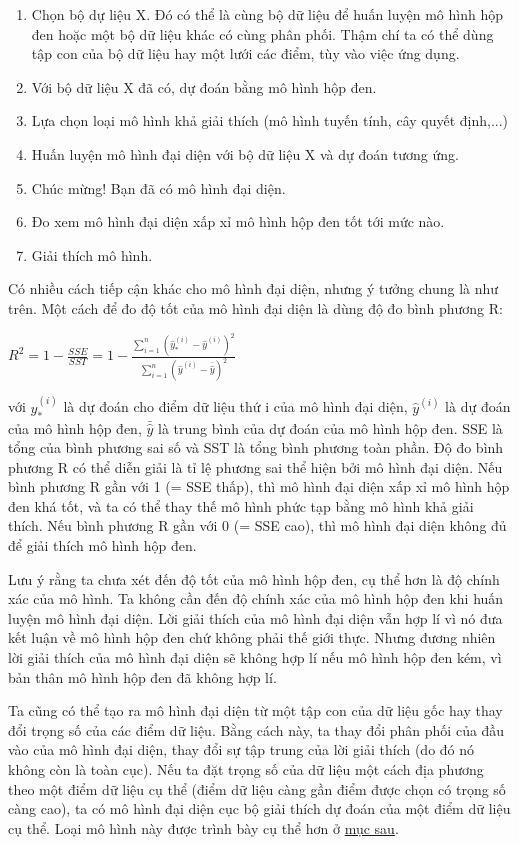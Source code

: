 \begin{enumerate}
    \item Chọn bộ dự liệu X. Đó có thể là cùng bộ dữ liệu để huấn luyện mô hình hộp đen hoặc một bộ dữ liệu khác có cùng phân phối. Thậm chí ta có thể dùng tập con của bộ dữ liệu hay một lưới các điểm, tùy vào việc ứng dụng.
    \item Với bộ dữ liệu X đã có, dự đoán bằng mô hình hộp đen.
    \item Lựa chọn loại mô hình khả giải thích (mô hình tuyến tính, cây quyết định,...)
    \item Huấn luyện mô hình đại diện với bộ dữ liệu X và dự đoán tương ứng.
    \item Chúc mừng! Bạn đã có mô hình đại diện.
    \item Đo xem mô hình đại diện xấp xỉ mô hình hộp đen tốt tới mức nào.
    \item Giải thích mô hình.
\end{enumerate}

Có nhiều cách tiếp cận khác cho mô hình đại diện, nhưng ý tưởng chung là như trên. Một cách để đo độ tốt của mô hình đại diện là dùng độ đo bình phương R:
\begin{center}
    $R^2=1-\frac{SSE}{SST}=1-\frac{\sum_{i=1}^n(\hat{y}_*^{(i)}-\hat{y}^{(i)})^2}{\sum_{i=1}^n(\hat{y}^{(i)}-\bar{\hat{y}})^2}$
\end{center}
với $\hat{y}_*^{(i)}$ là dự đoán cho điểm dữ liệu thứ i của mô hình đại diện, $\hat{y}^{(i)}$ là dự đoán của mô hình hộp đen, $\bar{\hat{y}}$ là trung bình của dự đoán của mô hình hộp đen. SSE là tổng của bình phương sai số và SST là tổng bình phương toàn phần. Độ đo bình phương R có thể diễn giải là tỉ lệ phương sai thể hiện bởi mô hình đại diện. Nếu bình phương R gần với 1 (= SSE thấp), thì mô hình đại diện xấp xỉ mô hình hộp đen khá tốt, và ta có thể thay thế mô hình phức tạp bằng mô hình khả giải thích. Nếu bình phương R gần với 0 (= SSE cao), thì mô hình đại diện không đủ để giải thích mô hình hộp đen.

Lưu ý rằng ta chưa xét đến độ tốt của mô hình hộp đen, cụ thể hơn là độ chính xác của mô hình. Ta không cần đến độ chính xác của mô hình hộp đen khi huấn luyện mô hình đại diện. Lời giải thích của mô hình đại diện vẫn hợp lí vì nó đưa kết luận về mô hình hộp đen chứ không phải thế giới thực. Nhưng đương nhiên lời giải thích của mô hình đại diện sẽ không hợp lí nếu mô hình hộp đen kém, vì bản thân mô hình hộp đen đã không hợp lí.

Ta cũng có thể tạo ra mô hình đại diện từ một tập con của dữ liệu gốc hay thay đổi trọng số của các điểm dữ liệu. Bằng cách này, ta thay đổi phân phối của đầu vào của mô hình đại diện, thay đổi sự tập trung của lời giải thích (do đó nó không còn là toàn cục). Nếu ta đặt trọng số của dữ liệu một cách địa phương theo một điểm dữ liệu cụ thể (điểm dữ liệu càng gần điểm được chọn có trọng số càng cao), ta có mô hình đại diện cục bộ giải thích dự đoán của một điểm dữ liệu cụ thể. Loại mô hình này được trình bày cụ thể hơn ở \href{Chap_5.7}{mục sau}.

